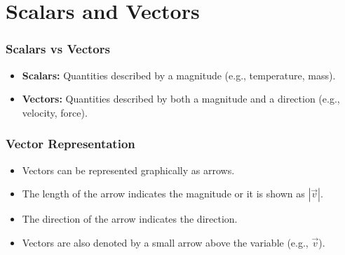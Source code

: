 
\section{Scalars and Vectors}
\begin{frame}
    \frametitle{Scalars vs Vectors}
    \begin{itemize}
        \item \textbf{Scalars:} Quantities described by a magnitude (e.g., temperature, mass).
        \item \textbf{Vectors:} Quantities described by both a magnitude and a direction (e.g., velocity, force).
    \end{itemize}
\end{frame}

\begin{frame}
    \frametitle{Vector Representation}
    \begin{itemize}
        \item Vectors can be represented graphically as arrows.
        \item The length of the arrow indicates the magnitude or it is shown as \(|\vec{v}|\).
        \item The direction of the arrow indicates the direction.
        \item Vectors are also denoted by a small arrow above the variable (e.g., \(\vec{v}\)).
    \end{itemize}
\end{frame}

